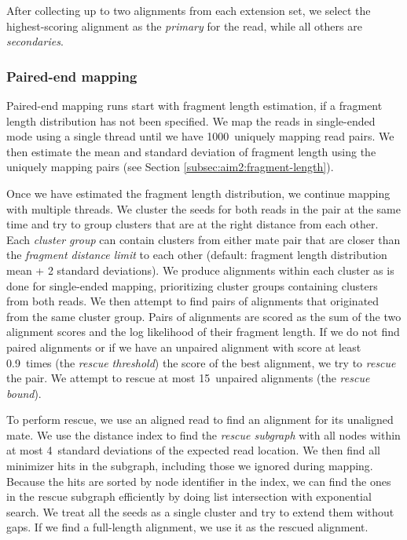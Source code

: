 \documentclass[11pt]{ucscthesis}
\newcommand{\param}[1]{\emph{#1}}
\newcommand{\vocab}[1]{\emph{#1}}
\begin{document}
After collecting up to two alignments from each extension set, we select the highest-scoring alignment as the \vocab{primary} for the read, while all others are \vocab{secondaries}.

\subsubsection{Paired-end mapping}

Paired-end mapping runs start with fragment length estimation, if a fragment length distribution has not been specified.
We map the reads in single-ended mode using a single thread until we have 1000~uniquely mapping read pairs.
We then estimate the mean and standard deviation of fragment length using the uniquely mapping pairs (see Section \ref{subsec:aim2:fragment-length}).

Once we have estimated the fragment length distribution, we continue mapping with multiple threads.
We cluster the seeds for both reads in the pair at the same time and try to group clusters that are at the right distance from each other.
Each \vocab{cluster group} can contain clusters from either mate pair that are closer than the \param{fragment distance limit} to each other (default: fragment length distribution mean + 2 standard deviations).
We produce alignments within each cluster as is done for single-ended mapping, prioritizing cluster groups containing clusters from both reads.
We then attempt to find pairs of alignments that originated from the same cluster group.
Pairs of alignments are scored as the sum of the two alignment scores and the log likelihood of their fragment length.
If we do not find paired alignments or if we have an unpaired alignment with score at least 0.9~times (the \param{rescue threshold}) the score of the best alignment, we try to \vocab{rescue} the pair.
We attempt to rescue at most 15~unpaired alignments (the \param{rescue bound}).

To perform rescue, we use an aligned read to find an alignment for its unaligned mate. We use the distance index to find the \vocab{rescue subgraph} with all nodes within at most 4~standard deviations of the expected read location.
We then find all minimizer hits in the subgraph, including those we ignored during mapping.
Because the hits are sorted by node identifier in the index, we can find the ones in the rescue subgraph efficiently by doing list intersection with exponential search.
We treat all the seeds as a single cluster and try to extend them without gaps.
If we find a full-length alignment, we use it as the rescued alignment.
\end{document}
